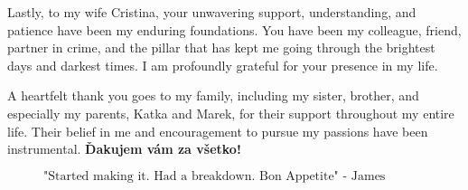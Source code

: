 Lastly, to my wife Cristina, your unwavering support, understanding, and patience have been my enduring foundations. You have been my colleague, friend, partner in crime, and the pillar that has kept me going through the brightest days and darkest times. I am profoundly grateful for your presence in my life.

A heartfelt thank you goes to my family, including my sister, brother, and especially my parents, Katka and Marek, for their support throughout my entire life. Their belief in me and encouragement to pursue my passions have been instrumental. \textbf{Ďakujem vám za všetko!}

\begin{figure}[b]
$$\mbox{"Started making it. Had a breakdown. Bon Appetite" - James Acaster}$$
\end{figure}


